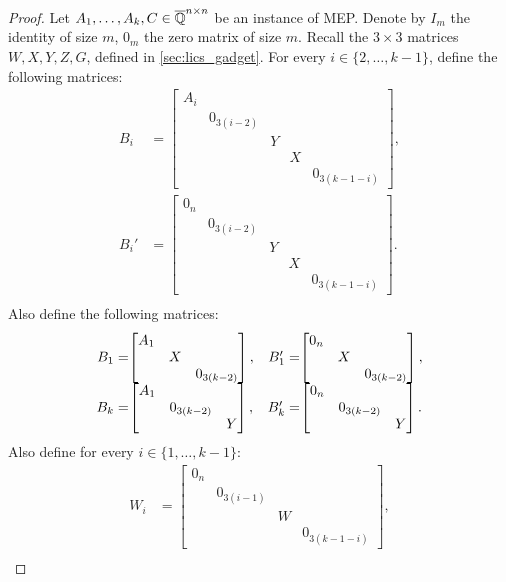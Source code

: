 \begin{proof}
Let $A_1,\ldots,A_k,C\in\overline{\mathbb{Q}}^{n\times n}$ be an instance of MEP\@. Denote by $I_m$ the identity of size $m$,
$0_m$ the zero matrix of size $m$. Recall the $3 \times 3$ matrices $W,X,Y,Z,G$, defined in \cref{sec:lics_gadget}.
For every $i\in\lbrace 2,\ldots,k-1\rbrace$, define the following matrices:
\begin{align*}
B_{i}&=\begin{bmatrix}A_{i}&&&&\\&0_{3(i-2)}&&&\\&&Y&&\\&&&X&\\&&&&0_{3(k-1-i)}\end{bmatrix},\\
B_{i}'&=\begin{bmatrix}0_n&&&&\\&0_{3(i-2)}&&&\\&&Y&&\\&&&X&\\&&&&0_{3(k-1-i)}\end{bmatrix}.\\
\end{align*}
Also define the following matrices:
\[
\begin{array}{r@{}c@{}cr@{}c}
B_1=&\begin{bmatrix}A_1&&\\&X&\\&&0_{3(k-2)}\end{bmatrix},&&
B_1'=&\begin{bmatrix}0_n&&\\&X&\\&&0_{3(k-2)}\end{bmatrix},\\
B_k=&\begin{bmatrix}A_1&&\\&0_{3(k-2)}&\\&&Y\end{bmatrix},&&
B_k'=&\begin{bmatrix}0_n&&\\&0_{3(k-2)}&\\&&Y\end{bmatrix}.\\
\end{array}\]
Also define for every $i\in\lbrace 1,\ldots,k-1\rbrace$:
\begin{align*}
W_{i}&=\begin{bmatrix}0_n&&&\\&0_{3(i-1)}&&\\&&W&\\&&&0_{3(k-1-i)}\end{bmatrix},\\

\end{align*}
\end{proof}
